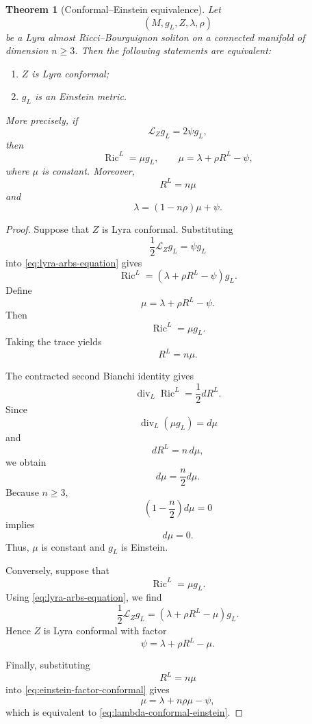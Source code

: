 \documentclass[a4paper,11pt]{article}
\theoremstyle{plain}
\newtheorem{theorem}{Theorem}[section]
\numberwithin{equation}{section}
\begin{document}
\begin{theorem}[Conformal--Einstein equivalence]
	\label{thm:conformal-einstein-equivalence}
	Let
	\[
	\left(
	M,g_{L},Z,\lambda,\rho
	\right)
	\]
	be a Lyra almost Ricci--Bourguignon soliton on a connected
	manifold of dimension \(n\geq3\). Then the following statements
	are equivalent:
	\begin{enumerate}
		\item \(Z\) is Lyra conformal;
		\item \(g_{L}\) is an Einstein metric.
	\end{enumerate}
	
	More precisely, if
	\[
	\mathcal L_{Z}g_{L}=2\psi g_{L},
	\]
	then
	\begin{equation}
		\operatorname{Ric}^{L}
		=
		\mu g_{L},
		\qquad
		\mu
		=
		\lambda+\rho R^{L}-\psi,
		\label{eq:einstein-factor-conformal}
	\end{equation}
	where \(\mu\) is constant. Moreover,
	\begin{equation}
		R^{L}
		=
		n\mu
		\label{eq:einstein-scalar-curvature}
	\end{equation}
	and
	\begin{equation}
		\lambda
		=
		(1-n\rho)\mu+\psi.
		\label{eq:lambda-conformal-einstein}
	\end{equation}
\end{theorem}

\begin{proof}
	Suppose that \(Z\) is Lyra conformal. Substituting
	\[
	\frac12\mathcal L_{Z}g_{L}
	=
	\psi g_{L}
	\]
	into \eqref{eq:lyra-arbs-equation} gives
	\[
	\operatorname{Ric}^{L}
	=
	\left(
	\lambda+\rho R^{L}-\psi
	\right)g_{L}.
	\]
	Define
	\[
	\mu
	=
	\lambda+\rho R^{L}-\psi.
	\]
	Then
	\[
	\operatorname{Ric}^{L}
	=
	\mu g_{L}.
	\]
	Taking the trace yields
	\[
	R^{L}=n\mu.
	\]
	
	The contracted second Bianchi identity gives
	\[
	\operatorname{div}_{L}
	\operatorname{Ric}^{L}
	=
	\frac12 dR^{L}.
	\]
	Since
	\[
	\operatorname{div}_{L}(\mu g_{L})=d\mu
	\]
	and
	\[
	dR^{L}=n\,d\mu,
	\]
	we obtain
	\[
	d\mu
	=
	\frac n2 d\mu.
	\]
	Because \(n\geq3\),
	\[
	\left(
	1-\frac n2
	\right)d\mu=0
	\]
	implies
	\[
	d\mu=0.
	\]
	Thus, \(\mu\) is constant and \(g_{L}\) is Einstein.
	
	Conversely, suppose that
	\[
	\operatorname{Ric}^{L}
	=
	\mu g_{L}.
	\]
	Using \eqref{eq:lyra-arbs-equation}, we find
	\[
	\frac12\mathcal L_{Z}g_{L}
	=
	\left(
	\lambda+\rho R^{L}-\mu
	\right)g_{L}.
	\]
	Hence \(Z\) is Lyra conformal with factor
	\[
	\psi
	=
	\lambda+\rho R^{L}-\mu.
	\]
	
	Finally, substituting
	\[
	R^{L}=n\mu
	\]
	into \eqref{eq:einstein-factor-conformal} gives
	\[
	\mu
	=
	\lambda+n\rho\mu-\psi,
	\]
	which is equivalent to
	\eqref{eq:lambda-conformal-einstein}.
\end{proof}
\end{document}
